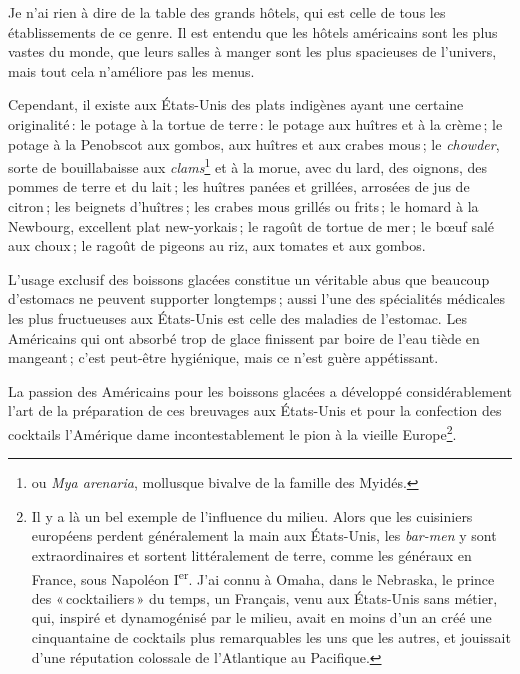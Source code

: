 Je n'ai rien à dire de la table des grands hôtels, qui est celle de tous les
établissements de ce genre. Il est entendu que les hôtels américains sont les
plus vastes du monde, que leurs salles à manger sont les plus spacieuses de
l'univers, mais tout cela n'améliore pas les menus.

Cependant, il existe aux États-Unis des plats indigènes ayant une certaine
originalité : le potage à la tortue de terre : le potage aux huîtres et à la
crème ; le potage à la Penobscot aux gombos, aux huîtres et aux crabes mous ;
le \textit{chowder}, sorte de bouillabaisse aux \textit{clams}\footnote{ou
\textit{Mya arenaria}, mollusque bivalve de la famille des Myidés.} et à la
morue, avec du lard, des oignons, des pommes de terre et du lait ; les huîtres
panées et grillées, arrosées de jus de citron ; les beignets d'huîtres ; les
crabes mous grillés ou frits ; le homard à la Newbourg, excellent plat
new-yorkais ; le ragoût de tortue de mer ; le bœuf salé aux choux ; le ragoût
de pigeons au riz, aux tomates et aux gombos.

L'usage exclusif des boissons glacées constitue un véritable abus que beaucoup
d'estomacs ne peuvent supporter longtemps ; aussi l’une des spécialités
médicales les plus fructueuses aux États-Unis est celle des maladies de
l'estomac. Les Américains qui ont absorbé trop de glace finissent par boire de
l'eau tiède en mangeant ; c'est peut-être hygiénique, mais ce n'est guère
appétissant.

La passion des Américains pour les boissons glacées a développé
considérablement l'art de la préparation de ces breuvages aux États-Unis et
pour la confection des cocktails l'Amérique dame incontestablement le pion à la
vieille Europe\footnote{Il y a là un bel exemple de l'influence du milieu.
Alors que les cuisiniers européens perdent généralement la main aux États-Unis,
les \textit{bar-men} y sont extraordinaires et sortent littéralement de terre,
comme les généraux en France, sous Napoléon I\textsuperscript{er}. J'ai connu
à Omaha, dans le Nebraska, le prince des « cocktailiers » du temps, un
Français, venu aux États-Unis sans métier, qui, inspiré et dynamogénisé par le
milieu, avait en moins d'un an créé une cinquantaine de cocktails plus
remarquables les uns que les autres, et jouissait d'une réputation colossale de
l'Atlantique au Pacifique.}.

